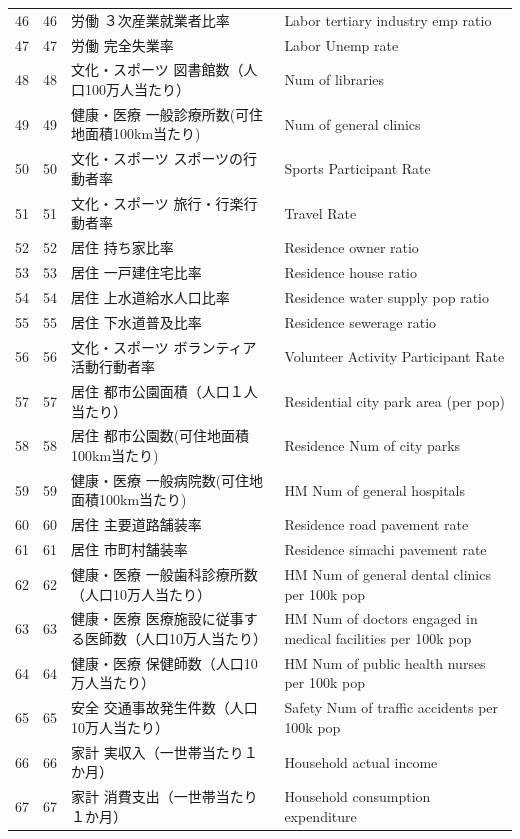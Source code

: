 \begin{table}[ht]
\begin{tabular}{rrll}
  46 &  46 & 労働 ３次産業就業者比率 & Labor tertiary industry emp ratio \\ 
  47 &  47 & 労働 完全失業率 & Labor Unemp rate \\ 
  48 &  48 & 文化・スポーツ 図書館数（人口100万人当たり） & Num of libraries \\ 
  49 &  49 & 健康・医療 一般診療所数(可住地面積100km当たり) & Num of general clinics \\ 
  50 &  50 & 文化・スポーツ スポーツの行動者率 & Sports Participant Rate \\ 
  51 &  51 & 文化・スポーツ 旅行・行楽行動者率 & Travel Rate \\ 
  52 &  52 & 居住 持ち家比率 & Residence owner ratio \\ 
  53 &  53 & 居住 一戸建住宅比率 & Residence house ratio \\ 
  54 &  54 & 居住 上水道給水人口比率 & Residence water supply pop ratio \\ 
  55 &  55 & 居住 下水道普及比率 & Residence sewerage ratio \\ 
  56 &  56 & 文化・スポーツ ボランティア活動行動者率 & Volunteer Activity Participant Rate \\ 
  57 &  57 & 居住 都市公園面積（人口１人当たり） & Residential city park area (per pop) \\ 
  58 &  58 & 居住 都市公園数(可住地面積100km当たり) & Residence Num of city parks \\ 
  59 &  59 & 健康・医療 一般病院数(可住地面積100km当たり) & HM Num of general hospitals \\ 
  60 &  60 & 居住 主要道路舗装率 & Residence road pavement rate \\ 
  61 &  61 & 居住 市町村舗装率 & Residence simachi pavement rate \\ 
  62 &  62 & 健康・医療 一般歯科診療所数（人口10万人当たり） & HM Num of general dental clinics per 100k pop \\ 
  63 &  63 & 健康・医療 医療施設に従事する医師数（人口10万人当たり） & HM Num of doctors engaged in medical facilities per 100k pop \\ 
  64 &  64 & 健康・医療 保健師数（人口10万人当たり） & HM Num of public health nurses per 100k pop \\ 
  65 &  65 & 安全 交通事故発生件数（人口10万人当たり） & Safety Num of traffic accidents per 100k pop \\ 
  66 &  66 & 家計 実収入（一世帯当たり１か月） & Household actual income \\ 
  67 &  67 & 家計 消費支出（一世帯当たり１か月） & Household consumption expenditure \\ 

\end{tabular}
\end{table}
